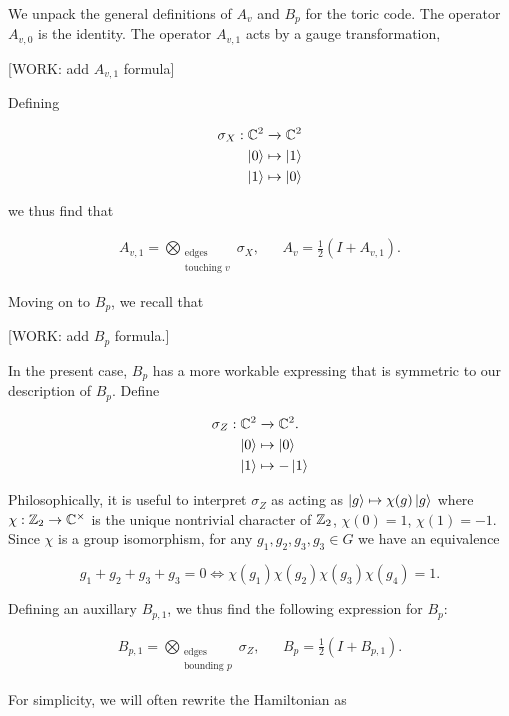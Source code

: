 \documentclass{article}
\theoremstyle{definition}
\numberwithin{figure}{section}
\begin{document}
We unpack the general definitions of $A_v$ and $B_p$ for the toric code. The operator $A_{v,0}$ is the identity. The operator $A_{v,1}$ acts by a gauge transformation,

[WORK: add $A_{v,1}$ formula]

Defining

\begin{align*}
\sigma_X:\mathbb{C}^2&\xrightarrow{}\mathbb{C}^2\\
\ket{0}&\mapsto \ket{1}\\
\ket{1}&\mapsto \ket{0}
\end{align*}

we thus find that

\begin{align*}
A_{v,1}=\bigotimes_{\substack{\text{edges} \\ \text{touching }v}}\sigma_X, && A_v=\frac{1}{2}\left(I + A_{v,1}\right).
\end{align*}

Moving on to $B_p$, we recall that

[WORK: add $B_p$ formula.]

In the present case, $B_p$ has a more workable expressing that is symmetric to our description of $B_p$. Define

\begin{align*}
\sigma_Z:\mathbb{C}^2&\xrightarrow{}\mathbb{C}^2.\\
\ket{0}&\mapsto \ket{0}\\
\ket{1}&\mapsto -\ket{1}
\end{align*}

Philosophically, it is useful to interpret $\sigma_Z$ as acting as $\ket{g}\mapsto \chi(g)\ket{g}$ where $\chi:\mathbb{Z}_2\to\mathbb{C}^\times$ is the unique nontrivial character of $\mathbb{Z}_2$, $\chi(0)=1$, $\chi(1)=-1$. Since $\chi$ is a group isomorphism, for any $g_1,g_2,g_3,g_3\in G$ we have an equivalence

$$g_1+g_2+g_3+g_3=0 \iff \chi(g_1)\chi(g_2)\chi(g_3)\chi(g_4)=1.$$

Defining an auxillary $B_{p,1}$, we thus find the following expression for $B_p$:

\begin{align*}
B_{p,1}=\bigotimes_{\substack{\text{edges} \\ \text{bounding }p}}\sigma_Z, && B_p=\frac{1}{2}\left(I + B_{p,1}\right).
\end{align*}

For simplicity, we will often rewrite the Hamiltonian as
\end{document}
